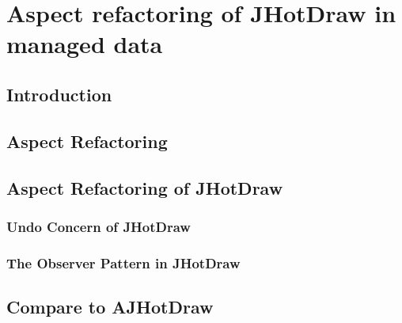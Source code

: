 
\chapter{Aspect refactoring of JHotDraw in managed data}\label{AspectRefactoring}

\section{Introduction}

\section{Aspect Refactoring}

\section{Aspect Refactoring of JHotDraw}

\subsection{Undo Concern of JHotDraw}\label{Undo JHotDraw}



\subsection{The Observer Pattern in JHotDraw}\label{The Observer Pattern in JHotDraw}


\section{Compare to AJHotDraw}